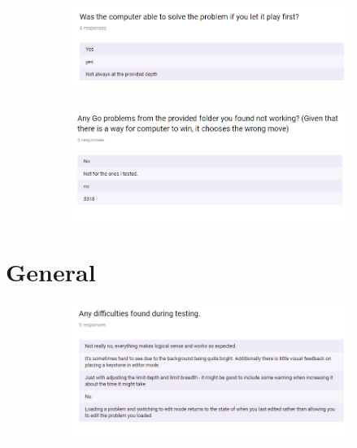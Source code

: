 \documentclass{l4proj}
\begin{document}
\begin{appendices}
\begin{figure}[H]
\centering
\begin{subfigure}[b]{\textwidth}
\centering
\includegraphics[width=\textwidth]{A1-2/2.png}
\end{subfigure}
\end{figure}



\begin{figure}[H]
\centering
\begin{subfigure}[b]{\textwidth}
\centering
\includegraphics[width=\textwidth]{A1-2/3.png}
\end{subfigure}
\end{figure}

\section{General}

\begin{figure}[H]
\centering
\begin{subfigure}[b]{\textwidth}
\centering
\includegraphics[width=\textwidth]{A1-2/4.png}
\end{subfigure}
\end{figure}


\end{appendices}
\end{document}

